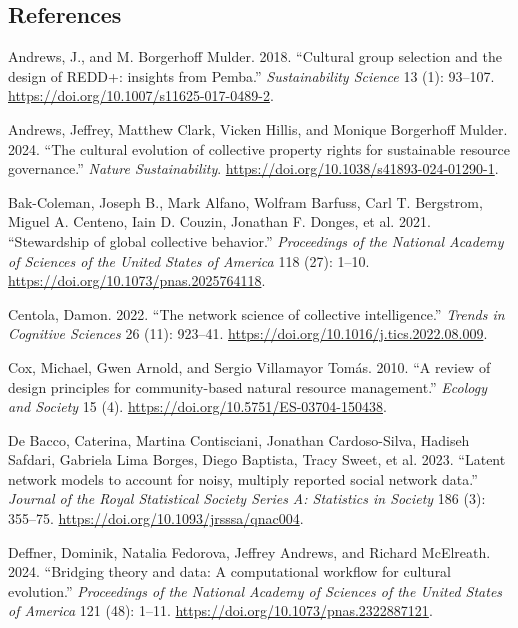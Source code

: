 \documentclass[
]{article}
\newlength{\cslhangindent}
\newenvironment{CSLReferences}[2] %
 {\begin{list}{}{%
  \setlength{\itemindent}{0pt}
  \setlength{\leftmargin}{0pt}
  \setlength{\parsep}{0pt}
  \ifodd #1
   \setlength{\leftmargin}{\cslhangindent}
   \setlength{\itemindent}{-1\cslhangindent}
  \fi
  \setlength{\itemsep}{#2\baselineskip}}}
 {\end{list}}
\begin{document}
\subsection{References}\label{references}

\label{refs}
\begin{CSLReferences}{1}{0}
Andrews, J., and M. Borgerhoff Mulder. 2018. {``{Cultural group
selection and the design of REDD+: insights from Pemba}.''}
\emph{Sustainability Science} 13 (1): 93--107.
\url{https://doi.org/10.1007/s11625-017-0489-2}.

Andrews, Jeffrey, Matthew Clark, Vicken Hillis, and Monique Borgerhoff
Mulder. 2024. {``{The cultural evolution of collective property rights
for sustainable resource governance}.''} \emph{Nature Sustainability}.
\url{https://doi.org/10.1038/s41893-024-01290-1}.

Bak-Coleman, Joseph B., Mark Alfano, Wolfram Barfuss, Carl T. Bergstrom,
Miguel A. Centeno, Iain D. Couzin, Jonathan F. Donges, et al. 2021.
{``{Stewardship of global collective behavior}.''} \emph{Proceedings of
the National Academy of Sciences of the United States of America} 118
(27): 1--10. \url{https://doi.org/10.1073/pnas.2025764118}.

Centola, Damon. 2022. {``{The network science of collective
intelligence}.''} \emph{Trends in Cognitive Sciences} 26 (11): 923--41.
\url{https://doi.org/10.1016/j.tics.2022.08.009}.

Cox, Michael, Gwen Arnold, and Sergio Villamayor Tomás. 2010. {``{A
review of design principles for community-based natural resource
management}.''} \emph{Ecology and Society} 15 (4).
\url{https://doi.org/10.5751/ES-03704-150438}.

De Bacco, Caterina, Martina Contisciani, Jonathan Cardoso-Silva, Hadiseh
Safdari, Gabriela Lima Borges, Diego Baptista, Tracy Sweet, et al. 2023.
{``{Latent network models to account for noisy, multiply reported social
network data}.''} \emph{Journal of the Royal Statistical Society Series
A: Statistics in Society} 186 (3): 355--75.
\url{https://doi.org/10.1093/jrsssa/qnac004}.

Deffner, Dominik, Natalia Fedorova, Jeffrey Andrews, and Richard
McElreath. 2024. {``{Bridging theory and data: A computational workflow
for cultural evolution}.''} \emph{Proceedings of the National Academy of
Sciences of the United States of America} 121 (48): 1--11.
\url{https://doi.org/10.1073/pnas.2322887121}.


\end{CSLReferences}
\end{document}
